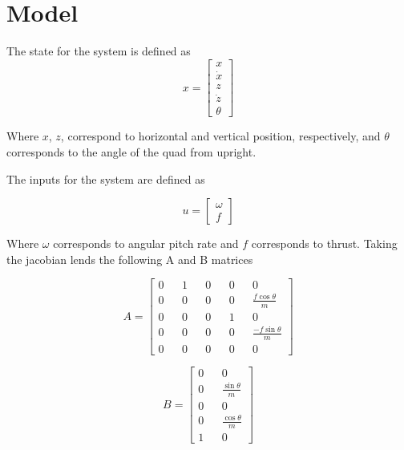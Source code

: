 \documentclass[12pt]{article}
\begin{document}
\section{Model}

The state for the system is defined as
\begin{equation}
\label{state}
x = \begin{bmatrix} x\\ \dot{x} \\ z \\ \dot{z} \\ \theta \end{bmatrix}
\end{equation}

Where $x$, $z$, correspond to horizontal and vertical position, respectively, and $\theta$ corresponds to the angle of the quad from upright.

The inputs for the system are defined as

\begin{equation}
\label{inputs}
u = \begin{bmatrix} \omega \\ f \end{bmatrix}
\end{equation}

Where $\omega$ corresponds to angular pitch rate and $f$ corresponds to thrust.
Taking the jacobian lends the following A and B matrices

\begin{equation}
\label{A_matrix_intermediate}
A = \begin{bmatrix} 0 && 1 && 0 && 0 && 0 \\ 0 && 0 && 0 && 0 && \frac{f\cos{\theta}}{m} \\  0 && 0 && 0 && 1 && 0 \\ 0 && 0 && 0 && 0 && \frac{-f\sin{\theta}}{m} \\ 0 && 0 && 0 && 0 && 0 \end{bmatrix}
\end{equation}

\begin{equation}
\label{B_matrix_intermediate}
B = \begin{bmatrix} 0 && 0 \\ 0 && \frac{\sin{\theta}}{m} \\ 0 && 0 \\ 0 && \frac{\cos{\theta}}{m} \\ 1 && 0 \end{bmatrix}
\end{equation}
\end{document}

